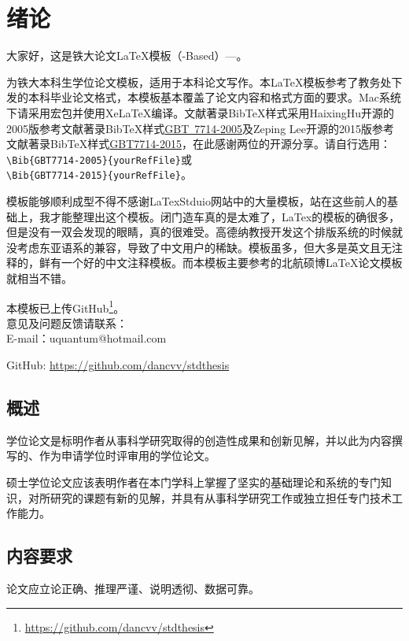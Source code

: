 \chapter{绪论}

大家好，这是铁大论文\LaTeX{}模板（\CTeX{}-Based）---\STDThesis{}。

\STDThesis{}为铁大本科生学位论文模板，适用于本科论文写作。本\LaTeX{}模板参考了教务处下发的本科毕业论文格式，本模板基本覆盖了论文内容和格式方面的要求。Mac系统下请采用宏包并使用XeLaTeX编译。文献著录BibTeX样式采用HaixingHu开源的2005版参考文献著录BibTeX样式\href{https://github.com/Haixing-Hu/GBT7714-2005-BibTeX-Style}{GBT~7714-2005}及Zeping Lee开源的2015版参考文献著录BibTeX样式\href{https://github.com/zepinglee/gbt7714-bibtex-style}{GBT7714-2015}，在此感谢两位的开源分享。请自行选用：\\
\verb|\Bib{GBT7714-2005}{yourRefFile}|或\\
\verb|\Bib{GBT7714-2015}{yourRefFile}|。

模板能够顺利成型不得不感谢LaTexStduio网站中的大量模板，站在这些前人的基础上，我才能整理出这个模板。闭门造车真的是太难了，LaTex的模板的确很多，但是没有一双会发现的眼睛，真的很难受。高德纳教授开发这个排版系统的时候就没考虑东亚语系的兼容，导致了中文用户的稀缺。模板虽多，但大多是英文且无注释的，鲜有一个好的中文注释模板。而本模板主要参考的北航硕博\LaTeX 论文模板就相当不错。

本模板已上传GitHub\footnote{\href{https://github.com/dancvv/stdthesis}{https://github.com/dancvv/stdthesis}}。\\

意见及问题反馈请联系：\\
\indent E-mail：uquantum@hotmail.com

\indent GitHub: \href{https://github.com/dancvv/stdthesis}{https://github.com/dancvv/stdthesis}
\section{概述}
学位论文是标明作者从事科学研究取得的创造性成果和创新见解，并以此为内容撰写的、作为申请学位时评审用的学位论文。

硕士学位论文应该表明作者在本门学科上掌握了坚实的基础理论和系统的专门知识，对所研究的课题有新的见解，并具有从事科学研究工作或独立担任专门技术工作能力。

\section{内容要求}
论文应立论正确、推理严谨、说明透彻、数据可靠。


